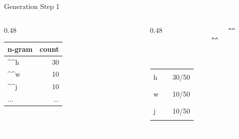 \documentclass[aspectratio=169]{beamer}
\renewcommand{\textbf}[1]{\textcolor{white}{\bfseries #1}}
\begin{document}
\begin{frame}[c,fragile]{Generation Step 1}
\begin{columns}[c]
\begin{column}{0.48\textwidth}
\textbf{Trigrams starting with ``\textasciicircum\textasciicircum'':}

\vspace{0.5em}
\begin{tabular}{|l|r|}
\hline
\rowcolor{codebg}
n-gram & count \\
\hline
\textasciicircum\textasciicircum h & 30 \\
\textasciicircum\textasciicircum w & 10 \\
\textasciicircum\textasciicircum j & 10 \\
... & ... \\
\hline
\end{tabular}

\vspace{0.5em}
\textbf{Total: 50}
\end{column}

\begin{column}{0.48\textwidth}
\textbf{Generated so far:} \texttt{\textasciicircum\textasciicircum}\\
\textbf{Current context:} \texttt{\textasciicircum\textasciicircum}

\vspace{0.5em}
\textbf{Probabilities:}

\begin{tabular}{@{}l@{ }l@{ }l@{}}
h & \textcolor{miamired}{\rule{3.6cm}{0.3cm}} & 30/50 \\
w & \textcolor{miamired}{\rule{1.2cm}{0.3cm}} & 10/50 \\
j & \textcolor{miamired}{\rule{1.2cm}{0.3cm}} & 10/50
\end{tabular}

\vspace{0.5em}
\textbf{Selected: h}
\end{column}
\end{columns}
\end{frame}
\end{document}
